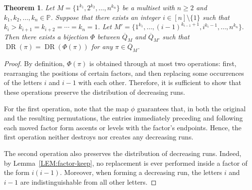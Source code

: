 \documentclass[11pt]{article}
\DeclareMathOperator{\DR}{DR}
\DeclareMathOperator{\ar}{arc}
\numberwithin{equation}{section}
\newtheorem{thm}{Theorem}[section]
\def\oQ{\overline{Q}}
\begin{document}
%	
%	
%	

\begin{thm}\label{THM:bijections-run}
	Let $M=\{1^{k_1},2^{k_2},\ldots,n^{k_n}\}$ be a multiset with $n\geq 2$ and $k_1,k_2,\ldots,k_n\in\mathbb P$. 
	Suppose that there exists an integer $i\in[n]\setminus\{1\}$ such that 
	$k_i>k_{i+1}=k_{i+2}=\cdots=k_n=1$. 
	Let 
	$
	M'=\{1^{k_1},\ldots,(i-1)^{k_{i-1}+1},i^{k_i-1},\ldots,n^{k_n}\}.
	$
	Then there exists a bijection $\Phi$ between $\overline{Q}_M$ and $\overline{Q}_{M'}$ such that
	$
	\DR(\pi)=\DR(\Phi(\pi))
	$
	for any $\pi\in \overline{Q}_M$.
\end{thm}
\begin{proof}
	By definition, $\Phi(\pi)$ is obtained through at most two operations: 
	first, rearranging the positions of certain factors, and then replacing some occurrences of the letters $i$ and $i-1$ with each other. Therefore, it is sufficient to show that these operations preserve the distribution of decreasing runs.
	
	For the first operation, note that the map $\phi$ guarantees that, in both the original and the resulting permutations, the entries immediately preceding and following each moved factor form ascents or levels with the factor's endpoints. Hence, the first operation neither destroys nor creates any decreasing runs.
	
	The second operation also preserves the distribution of decreasing runs. 
	Indeed, by Lemma~\ref{LEM:factor-keep}, no replacement is ever performed inside a factor of the form $i(i-1)$. 
	Moreover, when forming a decreasing run, the letters $i$ and $i-1$ are indistinguishable from all other letters.
\end{proof}
\end{document}
